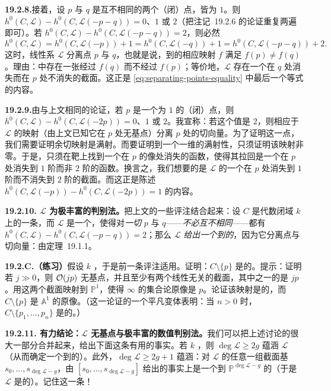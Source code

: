 \textbf{19.2.8.}\quad 接着，设 $p$ 与 $q$ 是互不相同的两个（闭）点，\trDegree{}皆为 $1$。则 $h^0(C,\mathscr{L})-h^0(C,\mathscr{L}(-p-q))=0$、$1$ 或 $2$（把\mbox{注记~19.2.6} 的论证重复两遍即可）。若 $h^0(C,\mathscr{L})-h^0(C,\mathscr{L}(-p-q))=2$，则必然
\begin{equation*}\tag{19.2.8.1}\label{eq:separating-points-equality}
h^0(C,\mathscr{L})=h^0(C,\mathscr{L}(-p))+1=h^0(C,\mathscr{L}(-q))+1=h^0(C,\mathscr{L}(-p-q))+2.
\end{equation*}
这时，线性系 $\mathscr{L}$ 分离点 $p$ 与 $q$，也就是说，到\trProjectiveSpace{}的相应映射 $f$ 满足 $f(p)\ne f(q)$。理由：\trProjectiveSpace{}中存在一张\trHyperplane{}经过 $f(q)$ 而不经过 $f(p)$；等价地，$\mathscr{L}$ 存在一个在 $q$ 处消失而在 $p$ 处不消失的截面。这正是 \eqref{eq:separating-points-equality} 中最后一个等式的内容。

\textbf{19.2.9.}\quad 由与上文相同的论证，若 $p$ 是一个\trDegree{}为 $1$ 的（闭）点，则 $h^0(C,\mathscr{L})-h^0(C,\mathscr{L}(-2p))=0$、$1$ 或 $2$。我宣称：若这个值是 $2$，则相应于 $\mathscr{L}$ 的映射（由上文已知它在 $p$ 处无基点）分离 $p$ 处的切向量。为了证明这一点，我们需要证明余切映射是满射。而要证明到一个一维\trVectorSpace{}的满射性，只须证明该映射非零。于是，只须在靶上找到一个在 $p$ 的像处消失的函数，使得其拉回是一个在 $p$ 处消失到 $1$ 阶而非 $2$ 阶的函数。换言之，我们想要的是 $\mathscr{L}$ 的一个在 $p$ 处消失到 $1$ 阶而不消失到 $2$ 阶的截面。而这正是陈述 $h^0(C,\mathscr{L}(-p))-h^0(C,\mathscr{L}(-2p))=1$ 的内容。

\textbf{19.2.10. $\mathscr{L}$ 为极丰富的判别法。}\quad 把上文的一些评注结合起来：设 $C$ 是代数闭域 $k$ 上的一条\trCurve，而 $\mathscr{L}$ 是一个\trInvertibleSheaf，使得对\emph{一切}\trClosedPoint{} $p$ 与 $q$——\emph{不必互不相同}——都有 $h^0(C,\mathscr{L})-h^0(C,\mathscr{L}(-p-q))=2$；那么 $\mathscr{L}$ \emph{给出一个到\trProjectiveSpace{}的\trClosedEmbedding}，因为它分离点与切向量：由\mbox{定理~19.1.1}。

\textbf{19.2.C.（练习）}\quad 假设 $k$ \trAlgClosed，于是前一条评注适用。证明：$C\setminus\{p\}$ 是\trAffine{}的。提示：证明若 $j\gg 0$，则 $\mathcal{O}(jp)$ 无基点，并且至少有两个线性无关的截面，其中之一的\trDivisor{}是 $jp$。用这两个截面映射到 $\mathbb{P}^1$，使得 $\infty$ 的集合论原像是 $p$。论证该映射是\trFinite{}的，而 $C\setminus\{p\}$ 是 $\mathbb{A}^1$ 的原像。（这一论证的一个平凡变体表明：当 $n>0$ 时，$C\setminus\{p_1,\dots,p_n\}$ 是\trAffine{}的。）

\textbf{19.2.11. 有力结论：$\mathscr{L}$ 无基点与极丰富的数值判别法。}\quad 我们可以把上述讨论的很大一部分合并起来，给出下面这条有用的事实。若 $k$ \trAlgClosed，则 $\deg\mathscr{L}\ge 2g$ 蕴涵 $\mathscr{L}$ \trBasePointFree（从而确定一个到\trProjectiveSpace{}的\trMorphism）。此外，$\deg\mathscr{L}\ge 2g+1$ 蕴涵：对 $\mathscr{L}$ 的任意一组截面基 $s_0,\dots,s_{\deg\mathscr{L}-g}$，由 $[s_0,\dots,s_{\deg\mathscr{L}-g}]$ 给出的\trMorphism{}事实上是一个到 $\mathbb{P}^{\deg\mathscr{L}-g}$ 的\trClosedEmbedding（于是 $\mathscr{L}$ 是\trVeryAmple{}的）。记住这一条！

